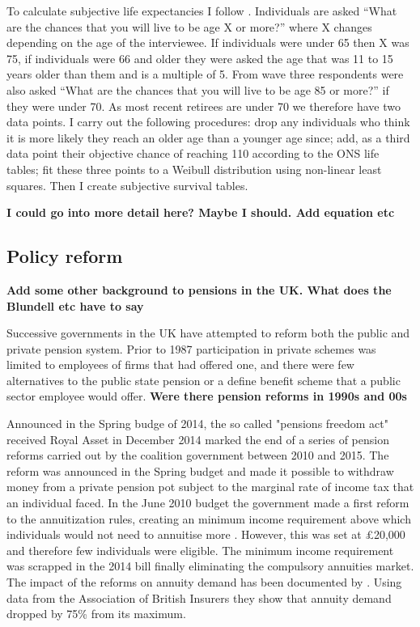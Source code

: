 \documentclass[12pt]{article}
\begin{document}

To calculate subjective life expectancies I follow \cite{odea_sturrock_rest_2023}. Individuals are asked “What are the chances that you will
live to be age X or more?” where X changes depending on the age of the interviewee. If individuals were under 65 then X was 75, if individuals
were 66 and older they were asked the age that was 11 to 15 years older than them and is a multiple of 5. From wave three respondents were
also asked “What are the chances that you will live to be age 85 or more?” if they were under 70. As most recent retirees are under 70 we
therefore have two data points. I carry out the following procedures: drop any individuals who think it is more likely they reach an older
age than a younger age since; add, as a third data point their objective chance of reaching 110 according to the ONS life tables; fit these
three points to a Weibull distribution using non-linear least squares. Then I create subjective survival tables.

\textbf{I could go into more detail here? Maybe I should. Add equation etc}



\subsection{Policy reform}

\textbf{Add some other background to pensions in the UK. What does the Blundell etc have
  to say}

Successive governments in the UK have attempted to reform both the public and private pension system. Prior
to 1987 participation in private schemes was limited to employees of firms that had offered one, and there
were few alternatives to the public state pension or a define benefit scheme that a public sector employee
would offer. \textbf{Were there pension reforms in 1990s and 00s}

Announced in the Spring budge of 2014, the so called "pensions freedom act" received Royal Asset in December 2014 marked the end of a series
of pension reforms carried out by the coalition government between 2010 and 2015. The reform was announced
in the Spring budget and made it possible to withdraw money from a private pension pot subject to the
marginal rate of income tax that an individual faced. In the June 2010 budget the government made a first
reform to the annuitization rules, creating an minimum income requirement above which individuals would not need to
annuitise more \cite{finance_act_hmt_2011}. However, this was set at £20,000 and therefore few individuals
were eligible. The minimum income requirement was scrapped in the 2014 bill finally eliminating the
compulsory annuities market. The impact of the reforms on annuity demand has been documented by \cite{cannon_et_al_nier_2016}.
Using data from the Association of British Insurers they show that annuity demand dropped by 75\% from
its maximum.
\end{document}
